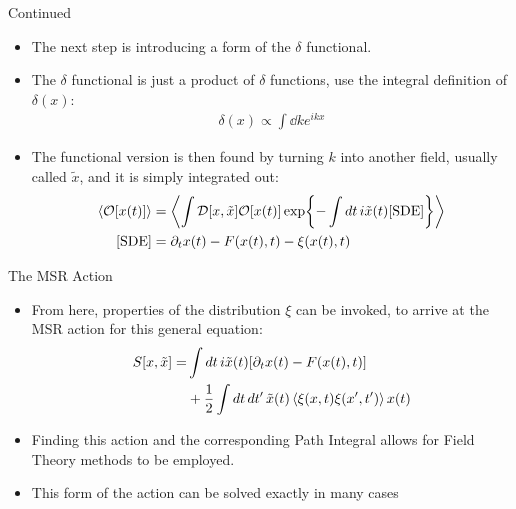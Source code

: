 \documentclass{beamer}
\def\D{\partial}
\begin{document}
\begin{frame}{Continued}
  \begin{itemize}
  \item The next step is introducing a form of the $\delta$ functional.
  \item The $\delta$ functional is just a product of $\delta$ functions, use the integral definition of $\delta(x)$:
    \begin{align*}
      \delta(x)\propto\int\dd{k}e^{ikx}
    \end{align*}
  \item The functional version is then found by turning $k$ into another field, usually called $\tilde{x}$, and it is simply integrated out:
    \begin{align*}
      \ev{\mathcal{O}[x(t)]}&=\ev{\int\mathcal{D}[x,\tilde{x}]\mathcal{O}[x(t)]
        \exp{-\int\dd{t}i\tilde{x}(t)\qty[\text{SDE}]}}\\
      [\text{SDE}]&=\D_t x(t)-F(x(t),t)-\xi(x(t),t)
    \end{align*}
  \end{itemize}
\end{frame}

\begin{frame}{The MSR Action}
  \begin{itemize}
  \item From here, properties of the distribution $\xi$ can be invoked, to arrive at the MSR action for this general equation:
    \begin{align*}
      S[x,\tilde{x}]=&\int\dd{t}i\tilde{x}(t)\qty[\D_t x(t)-F(x(t),t)]\\
      &+\frac12\int\dd{t}\dd{t'}\tilde{x}(t)\ev{\xi(x,t)\xi(x',t')}x(t)
    \end{align*}
  \item Finding this action and the corresponding Path Integral allows for Field Theory methods to be employed.
  \item This form of the action can be solved exactly in many cases
  \end{itemize}
\end{frame}
\end{document}
